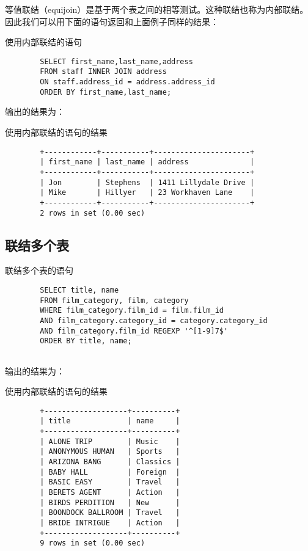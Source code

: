 \documentclass[UTF8]{article}
\begin{document}
等值联结（equijoin）是基于两个表之间的相等测试。这种联结也称为内部联结。因此我们可以用下面的语句返回和上面例子同样的结果：
\begin{listing}[H]
        \caption{使用内部联结的语句}
	\label{code:useinnerjoinclause}
\begin{verbatim}
        SELECT first_name,last_name,address 
        FROM staff INNER JOIN address 
        ON staff.address_id = address.address_id 
        ORDER BY first_name,last_name;
\end{verbatim}
\end{listing}

输出的结果为：

\begin{listing}[H]
	\caption{使用内部联结的语句的结果}
	\label{code:useinnerjoinclauseresult}
\begin{verbatim}
        +------------+-----------+----------------------+
        | first_name | last_name | address              |
        +------------+-----------+----------------------+
        | Jon        | Stephens  | 1411 Lillydale Drive |
        | Mike       | Hillyer   | 23 Workhaven Lane    |
        +------------+-----------+----------------------+
        2 rows in set (0.00 sec)
\end{verbatim}
\end{listing}

\subsection{联结多个表}

\begin{listing}[H]
        \caption{联结多个表的语句}
	\label{code:usemultijoinclause}
\begin{verbatim}
        SELECT title, name 
        FROM film_category, film, category 
        WHERE film_category.film_id = film.film_id 
        AND film_category.category_id = category.category_id 
        AND film_category.film_id REGEXP '^[1-9]7$' 
        ORDER BY title, name;
        
\end{verbatim}
\end{listing}

输出的结果为：

\begin{listing}[H]
	\caption{使用内部联结的语句的结果}
	\label{code:usemultijoinclauseresult}
\begin{verbatim}
        +-------------------+----------+
        | title             | name     |
        +-------------------+----------+
        | ALONE TRIP        | Music    |
        | ANONYMOUS HUMAN   | Sports   |
        | ARIZONA BANG      | Classics |
        | BABY HALL         | Foreign  |
        | BASIC EASY        | Travel   |
        | BERETS AGENT      | Action   |
        | BIRDS PERDITION   | New      |
        | BOONDOCK BALLROOM | Travel   |
        | BRIDE INTRIGUE    | Action   |
        +-------------------+----------+
        9 rows in set (0.00 sec)
\end{verbatim}
\end{listing}
\end{document}
